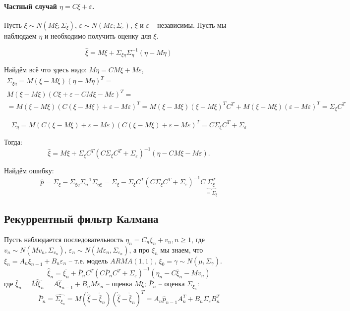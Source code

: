 \paragraph{Частный случай $\eta = C\xi + \varepsilon$.} Пусть $\xi \sim N(M\xi; \Sigma_\xi)$,
$\varepsilon \sim N(M\varepsilon; \Sigma_\varepsilon)$, $\xi$ и $\varepsilon$ -- независимы.
Пусть мы наблюдаем $\eta$ и необходимо получить оценку для $\xi$.

\[
  \hat{\xi} = M\xi + \Sigma_{\xi\eta} \Sigma_{\eta}^{-1} (\eta - M\eta)
\]

Найдём всё что здесь надо: $ M\eta = C M\xi + M\varepsilon$, 
\begin{multline*}
  \Sigma_{\xi\eta} = M(\xi-M\xi)(\eta-M\eta)^T = \\
  M(\xi-M\xi)( C\xi+\varepsilon - CM\xi - M\varepsilon )^T = \\
  = M(\xi-M\xi)\left( C(\xi-M\xi)+ \varepsilon - M\varepsilon \right)^T = 
  M(\xi-M\xi)(\xi-M\xi)^T C^T + M(\xi-M\xi)(\varepsilon-M\varepsilon)^T = \Sigma_\xi C^T
\end{multline*}

\[
  \Sigma_{\eta} = M( C(\xi-M\xi) + \varepsilon-M\varepsilon )( C(\xi-M\xi) + \varepsilon-M\varepsilon )^T =
  C \Sigma_\xi C^T + \Sigma_\varepsilon
\]

Тогда:
\[
  \hat{\xi} = M\xi + \Sigma_\xi C^T \left(C \Sigma_\xi C^T + \Sigma_\varepsilon\right)^{-1} \left(\eta-CM\xi - M\varepsilon\right).
\]

Найдём ошибку:
\[
  \hat{p} = \Sigma_\xi - \Sigma_{\xi\eta} \Sigma_{\eta}^{-1} \Sigma_{\eta\xi} =
  \Sigma_\xi - \Sigma_\xi C^T (C\Sigma_\xi C^T + \Sigma_\varepsilon)^{-1} C \underbrace{\Sigma_\xi^T }_{=\Sigma_\xi}
\]

\subsection{Рекуррентный фильтр Калмана}

Пусть наблюдается последовательность $\eta_n = C_n \xi_n + v_n, n \geqslant 1$,
где $v_n \sim N(Mv_n, \Sigma_{v_n})$,
$\varepsilon_n \sim N(M\varepsilon_n, \Sigma_{\varepsilon_n})$, а про $\xi_n$ мы знаем, что
$\xi_n = A_n \xi_{n-1} + B_n \varepsilon_n$ -- т.е. модель $ARMA(1, 1)$,
$\xi_0 = \gamma \sim N(\mu, \Sigma_\gamma)$.
\[
  \hat{\xi}_n = \bar{\xi_n} + \bar{P}_n C^T (C\bar{P}_n C^T + \Sigma_\varepsilon)^{-1} (\eta_n - C\bar{\xi}_n - Mv_n)
\]
где $\bar{\xi}_n = \widehat{M\xi_n} = A \hat{\xi}_{n-1} + B_n M\varepsilon_n$ -- оценка $M\xi$;
$\bar{P}_n$ -- оценка $\Sigma_{\xi_n}$:
\[
  \bar{P}_n = \widehat{\Sigma_{\xi_n}} =
  M\left(\mathring{\hat{\xi}}-\mathring{\bar{\xi}}_n\right)\left(\mathring{\hat{\xi}}-\mathring{\bar{\xi}}_n\right)^T =
  A_n \hat{p}_{n-1} A_n^T + B_n \Sigma_\varepsilon B_n^T
\]

